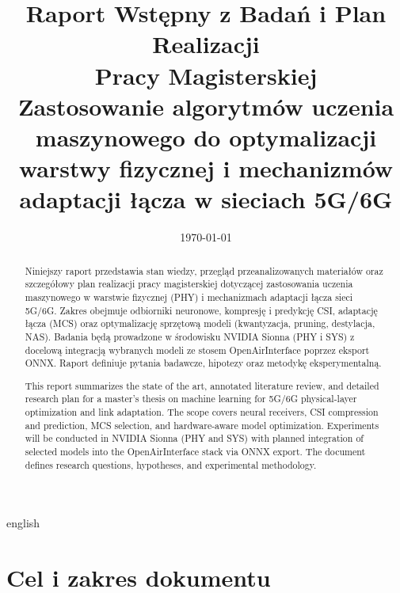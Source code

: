 \documentclass[12pt, a4paper]{article}
\title{%
    \vspace{-1.5cm}%
    \textbf{Raport Wstępny z Badań i Plan Realizacji\\Pracy Magisterskiej}\\[0.8em]
    \large Zastosowanie algorytmów uczenia maszynowego do optymalizacji\\warstwy fizycznej i mechanizmów adaptacji łącza w sieciach 5G/6G
}
\author{}
\date{\today}
\begin{document}
\maketitle
\thispagestyle{empty}

\begin{abstract}
\noindent
Niniejszy raport przedstawia stan wiedzy, przegląd przeanalizowanych materiałów oraz szczegółowy plan realizacji pracy magisterskiej dotyczącej zastosowania uczenia maszynowego w warstwie fizycznej (PHY) i mechanizmach adaptacji łącza sieci 5G/6G. Zakres obejmuje odbiorniki neuronowe, kompresję i predykcję CSI, adaptację łącza (MCS) oraz optymalizację sprzętową modeli (kwantyzacja, pruning, destylacja, NAS). Badania będą prowadzone w środowisku NVIDIA Sionna (PHY i SYS) z docelową integracją wybranych modeli ze stosem OpenAirInterface poprzez eksport ONNX. Raport definiuje pytania badawcze, hipotezy oraz metodykę eksperymentalną.
\end{abstract}

\begin{otherlanguage*}{english}
\begin{abstract}
\noindent
This report summarizes the state of the art, annotated literature review, and detailed research plan for a master's thesis on machine learning for 5G/6G physical-layer optimization and link adaptation. The scope covers neural receivers, CSI compression and prediction, MCS selection, and hardware-aware model optimization. Experiments will be conducted in NVIDIA Sionna (PHY and SYS) with planned integration of selected models into the OpenAirInterface stack via ONNX export. The document defines research questions, hypotheses, and experimental methodology.
\end{abstract}
\end{otherlanguage*}

\newpage
\tableofcontents
\newpage

\section{Cel i zakres dokumentu}
\end{document}
